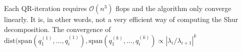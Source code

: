 Each QR-iteration requires $\mathcal O(n^3)$ flops and the algorithm only converge linearly. 
It is, in other words, not a very efficient way of computing the Shur decomposition.
%
The convergence of $\text{dist}( \text{span}(q_1^{(1)},\dots,q_i^{(1)}),\text{span}(q_1^{(k)},\dots,q_i^{(k)}) \propto|\lambda_i/\lambda_{i+1}|^k$

